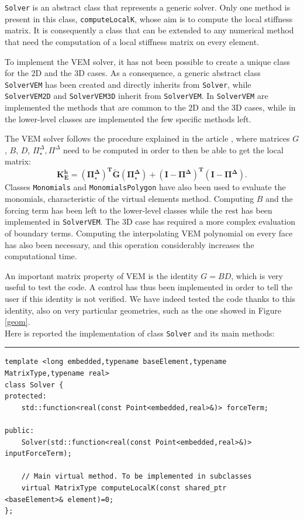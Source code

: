 \verb|Solver| is an abstract class that represents a generic solver. Only one method is present in this class, \verb|computeLocalK|, whose aim is to compute the local stiffness matrix. It is consequently a class that can be extended to any numerical method that need the computation of a local stiffness matrix on every element. 

To implement the VEM solver, it has not been possible to create a unique class for the $2$D and the $3$D cases. As a consequence, a generic abstract class \verb|SolverVEM| has been created and directly inherits from \verb|Solver|, while \verb|SolverVEM2D| and \verb|SolverVEM3D| inherit from \verb|SolverVEM|. In \verb|SolverVEM| are implemented the methods that are common to the $2$D and the $3$D cases, while in the lower-level classes are implemented the few specific methods left. 

The VEM solver follows the procedure explained in the article \cite{hitchhicker}, where matrices $G$, $B$, $D$, $\Pi_\star^\Delta,\Pi^\Delta$ need to be computed in order to then be able to get the local matrix:
$$ \mathbf{K_E^h= (\Pi^\Delta_\star)^T \tilde{G}
  (\Pi^\Delta_\star)+(I-\Pi^\Delta)^T (I-\Pi^\Delta)}. $$ 
Classes \verb|Monomials| and \verb|MonomialsPolygon| have also been used to evaluate the monomials, characteristic of the virtual elements method. Computing $B$ and the forcing term has been left to the lower-level classes while the rest has been implemented in \verb|SolverVEM|. The $3$D case has required a more complex evaluation of boundary terms. Computing the interpolating VEM polynomial on every face has also been necessary, and this operation considerably increases the computational time. 

An important matrix property of VEM is the identity $G = BD$, which is very useful to test the code. A control has thus been implemented in order to tell the user if this identity is not verified. We have indeed tested the code thanks to this identity, also on very particular geometries, such as the one showed in Figure \ref{geom}. \\

Here is reported the implementation of class \verb|Solver| and its main methods:

\noindent\rule{16cm}{1pt}
\begin{lstlisting}[caption=File \texttt{Solver.h}]
template <long embedded,typename baseElement,typename 
MatrixType,typename real>
class Solver {
protected:
    std::function<real(const Point<embedded,real>&)> forceTerm;
	
public:
    Solver(std::function<real(const Point<embedded,real>&)> 
inputForceTerm);

    // Main virtual method. To be implemented in subclasses
    virtual MatrixType computeLocalK(const shared_ptr
<baseElement>& element)=0;
};
\end{lstlisting}

